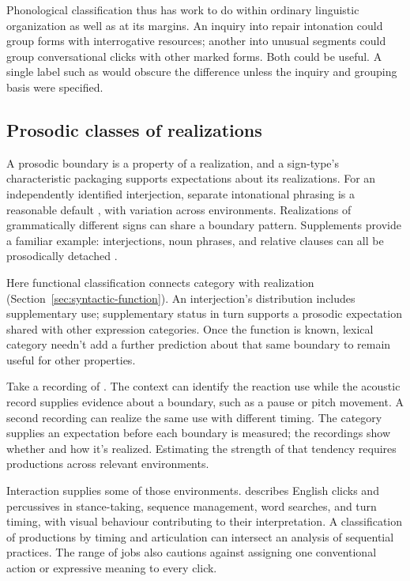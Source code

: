 \documentclass[12pt]{article}
\begin{document}
Phonological classification thus has work to do within ordinary linguistic
organization as well as at its margins. An inquiry into repair intonation
could group forms with interrogative resources; another into unusual
segments could group conversational clicks with other marked forms.
Both could be useful. A single label such as  would obscure
the difference unless the inquiry and grouping basis were specified.

\subsection{Prosodic classes of realizations}

A prosodic boundary is a property of a realization, and a sign-type's
characteristic packaging supports expectations about its realizations.
For an independently identified interjection, separate intonational
phrasing is a reasonable default \citep[108]{ameka1992}, with
variation across environments. Realizations of
grammatically different signs can share a boundary pattern. Supplements
provide a familiar example: interjections, noun phrases, and relative
clauses can all be prosodically detached
\citep[66, 1350]{HuddlestonPullum2002}.

Here functional classification connects category with realization
(Section~\ref{sec:syntactic-function}). An interjection's distribution
includes supplementary use; supplementary status in turn supports a
prosodic expectation shared with other expression categories. Once the
function is known, lexical category needn't add a further prediction
about that same boundary to remain useful for other properties.

Take a recording of . The
context can identify the reaction use while the acoustic record supplies
evidence about a boundary, such as a pause or pitch movement. A
second recording can realize the same use with different timing.
The category supplies an expectation before each boundary is measured;
the recordings show whether and how it's realized. Estimating the
strength of that tendency requires productions across relevant environments.

Interaction supplies some of those environments. \textcite{ogden2013clicks} describes English
clicks and percussives in stance-taking, sequence management, word searches,
and turn timing, with visual behaviour contributing to their interpretation. A classification of productions by timing and
articulation can intersect an analysis of sequential practices.
The range of jobs also cautions against assigning one conventional action
or expressive meaning to every click.
\end{document}
